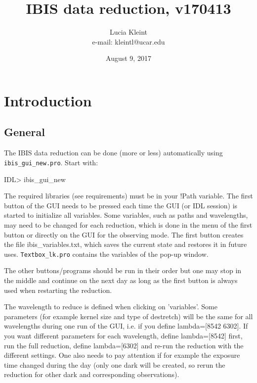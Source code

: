 \documentclass[a4paper,11pt]{article}
\begin{document}

\title{IBIS data reduction, v170413}

\author{Lucia Kleint \\
e-mail: \mbox{kleintl@ucar.edu}
}

\date{August 9, 2017}

\maketitle
\newpage

\tableofcontents
\newpage


\section{Introduction}
\subsection{General}
The IBIS data reduction can be done (more or less) automatically using \texttt{ibis\_gui\_new.pro}. Start with:

IDL> ibis\_gui\_new

The required libraries (see requirements) must be in your !Path variable. The first button of the GUI needs to be pressed each time the GUI (or IDL session) is started to initialize all variables. Some variables, such as paths and wavelengths, may need to be changed for each reduction, which is done in the menu of the first button or directly on the GUI for the observing mode. The first button creates the file ibis\_variables.txt, which saves the current state and restores it in future uses. \texttt{Textbox\_lk.pro} contains the variables of the pop-up window.

The other buttons/programs should be run in their order but one may stop
in the middle and continue on the next day as long as the first button
is always used when restarting the reduction.

The wavelength to reduce is defined when clicking on 'variables'. 
Some parameters (for example kernel size and type of destretch) will
be the same for all wavelengths during one run of the GUI, i.e. if
you define lambda=[8542 6302]. If you want different parameters for
each wavelength, define lambda=[8542] first, run the full reduction,
define lambda=[6302] and re-run the reduction with the different
settings. One also needs to pay attention if for example the exposure
time changed during the day (only one dark will be created, so rerun
the reduction for other dark and corresponding observations).
\end{document}
